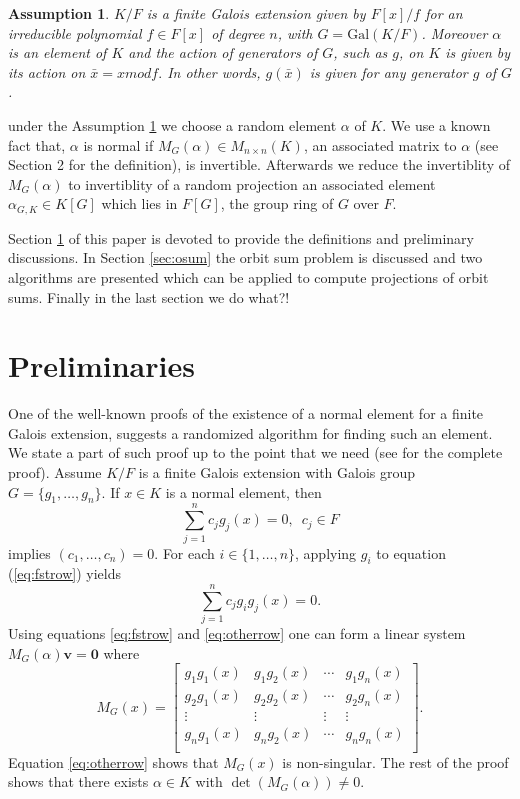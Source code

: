\documentclass[sigconf]{acmart}
\newcommand{\osum}[2]{\alpha_{#1,#2}}
\theoremstyle{acmplain}
\newtheorem{assumption}{Assumption}
\begin{document}
\begin{assumption}\label{assum}
$K/F$ is a finite Galois extension given by $ F[x]/f$ for an irreducible polynomial $f\in F[x]$ of degree $n$, with
 $G = \mathrm{Gal}(K/F)$. Moreover $\alpha$ is an element of $K$ and the action of generators of $ G$, such as $g$, on $K$ is given by its action on $\bar{x} = x mod f.$ In other words, $g(\bar{x})$ is given for any generator $g$ of $G$.
\end{assumption}

under the Assumption \ref{assum} we choose a random element $\alpha$ of $K$. We use a known fact that, $\alpha$ is normal 
if $M_G(\alpha) \in M_{n\times n}(K)$, an associated matrix to $\alpha$ (see Section 2 for the definition), is invertible. 
Afterwards we reduce the invertiblity of $M_G(\alpha)$ to invertiblity of a random projection an associated element 
$\osum{G}{K} \in K[G]$ which lies in $F[G]$, the group ring of $G$ over $F$. 

Section \ref{sec:pre} of this paper is devoted to provide the definitions and preliminary discussions. In Section \ref{sec:osum} 
the orbit sum problem is discussed and two algorithms are presented which can be applied to compute projections of orbit sums.
Finally in the last section we do what?!


\section{Preliminaries} \label{sec:pre}
One of the well-known proofs of the existence of a normal element for a finite Galois extension, suggests a randomized 
algorithm for finding such an element. We state a part of such proof up to the point that we need (see \cite[Theorem 6.13.1]{Lang} for the complete proof). Assume $K/F$ is a finite Galois extension with Galois group $G = \lbrace g_1 , \ldots ,
 g_n \rbrace$. If $x \in K$ is a normal element, then
 \begin{equation}\label{eq:fstrow}
 \sum_{j=1}^n 
 c_j g_j(x)=0, \,\,\, c_j \in F 
 \end{equation} 
 implies $(c_1, \ldots ,c_n) = 0$. For each $i \in \lbrace 1, \ldots , n\rbrace$, applying $g_i$ to equation (\ref{eq:fstrow}) yields
\begin{equation} \label{eq:otherrow}
 \sum_{j=1}^n 
 c_j g_i g_j(x)=0.
 \end{equation}
 Using equations \ref{eq:fstrow} and \ref{eq:otherrow} one can form a linear system $M_G(\alpha)\textbf{v} = \textbf{0}$ where 
 $$ M_G(x) =
\begin{bmatrix}
g_1 g_1(x) & g_1 g_2(x) & \cdots & g_1 g_n(x) \\
g_2 g_1(x) & g_2 g_2(x) & \cdots & g_2 g_n(x) \\
\vdots		& \vdots	& \vdots & \vdots \\
g_n g_1(x) & g_n g_2(x) & \cdots & g_n g_n(x) \\
\end{bmatrix}. 
 $$
 Equation \ref{eq:otherrow} shows that $M_G(x)$ is non-singular. The rest of the proof shows that there exists $\alpha \in K$ with $\det(M_G(\alpha))\neq 0$.
 
\end{document}
